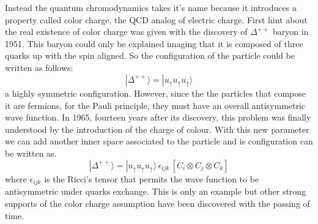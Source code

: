 \documentclass[12pt,a4paper]{book}
\begin{document}
	Instead the quantum chromodynamics takes it's name because it introduces a property called color charge, the QCD analog of electric charge. First hint about the real existence of color charge was given with the discovery of $\Delta^{++}$ baryon in 1951. This baryon could only be explained imaging that it is composed of three quarks up with the spin aligned. So the configuration of the particle could be written as follows:
	\[
	|\Delta^{++}\rangle = | u_{\uparrow} u_{\uparrow} u_{\uparrow} \rangle
	\]
	a highly symmetric configuration. However, since the the particles that compose it are fermions, for the Pauli principle, they must have an overall antisymmetric wave function. In 1965, fourteen years after its discovery, this problem was finally understood by the introduction of the charge of colour. With this new parameter we can add another inner space associated to the particle and is configuration can be written as.
	\[
	|\Delta^{++}\rangle = | u_{\uparrow} u_{\uparrow} u_{\uparrow} \rangle \, \epsilon_{ijk} \, \left[ C_i \otimes C_j \otimes C_k \right]
	\]
	where $\epsilon_{ijk}$ is the Ricci's tensor that permits the wave function to be antisymmetric under quarks exchange. This is only an example but other strong supports of the color charge assumption have been discovered with the passing of time.
	
\end{document}
